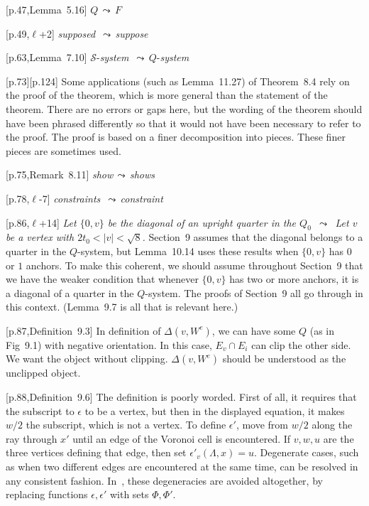 \documentclass[11pt]{amsart}
\def\lto{\ensuremath{\,\leadsto\,}}
\def\line{$\ell$}
\def\sz{small} %
\def\rmx{\rm}
\begin{document}
\begin{\sz}
\baselineskip

[p.47,Lemma~5.16] $Q\lto F$

[p.49,\line+2] {\it supposed} \lto {\it suppose}
	
[p.63,Lemma~7.10]
	${\mathcal S}$-{\it system} \lto $Q$-{\it system}
	
[p.73][p.124] {\rmx Some applications (such as Lemma~11.27) of Theorem~8.4 rely on
the proof of the theorem, which is more general than
the statement of the theorem.  There are no errors or gaps here,
but the wording of the theorem should have been phrased differently
so that it would not have been necessary to refer to the proof.  The proof is based on a finer
decomposition into pieces.  These finer pieces are sometimes used.}

[p.75,Remark~8.11]
	{\it show}\lto {\it shows}

[p.78,\line-7] {\it constraints} \lto{\it  constraint}

[p.86,\line+14] {\it Let $\{0,v\}$ be 
          the diagonal of an upright quarter in the $Q_0$
        \lto
       Let $v$ be a vertex with $2t_0<|v|<\sqrt8$.}
           {\rmx Section~9 assumes that the diagonal belongs to
          a quarter in the $Q$-system, but Lemma~10.14 uses these
          results when $\{0,v\}$ has $0$ or $1$ anchors.  To make
          this coherent, we should assume throughout Section~9 that
          we have the weaker condition that whenever $\{0,v\}$ has
          two or more anchors, it is a diagonal of a quarter in the $Q$-system.
          The proofs of Section~9 all go through in this context.
           (Lemma~9.7 is all that is relevant here.)}

[p.87,Definition~9.3]
	{\rmx In definition of $\Delta(v,W^e)$, we
	can have some $Q$ (as in Fig~9.1)
	with negative orientation.
	In this case, $E_v\cap E_i$ can clip
	the other side.  We want the object
	without clipping.   $\Delta(v,W^e)$ should be understood as the
        unclipped object.}
	
[p.88,Definition~9.6]
	{\rmx The definition is poorly worded.  First of
	all, it requires that the subscript to
	$\epsilon$ to be a vertex, but then in
	the displayed equation, it makes $w/2$ the
	subscript, which is not a vertex.   To
	define $\epsilon'$, move from $w/2$ along
	the ray through $x'$ until an edge of the
	Voronoi cell is encountered.  If $v,w,u$
	are the three vertices defining that edge,
	then set $\epsilon'_v(\Lambda,x)=u$.
	Degenerate cases, such as when two different
	edges are encountered at the same time,
	can be resolved in any consistent fashion.  In~\cite{hales:2008:collection},
      these degeneracies are avoided altogether, by replacing functions 
      $\epsilon,\epsilon'$ with sets $\Phi,\Phi'$.
     }
	

\end{\sz}
\end{document}

